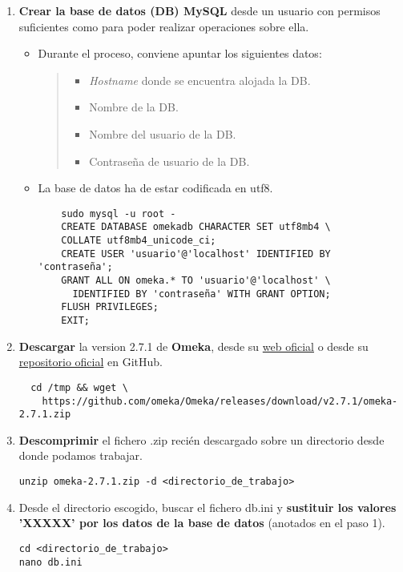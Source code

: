 \begin{enumerate}
\def\labelenumi{\arabic{enumi}.}
\tightlist
\item
  \textbf{Crear la base de datos (DB) MySQL} desde un usuario con
  permisos suficientes como para poder realizar operaciones sobre ella.

  \begin{itemize}
  \item
    Durante el proceso, conviene apuntar los siguientes datos:

    \begin{quote}
    \begin{itemize}
    \tightlist
    \item
      \emph{Hostname} donde se encuentra alojada la DB.
    \item
      Nombre de la DB.
    \item
      Nombre del usuario de la DB.
    \item
      Contraseña de usuario de la DB.
    \end{itemize}
    \end{quote}
  \item
    La base de datos ha de estar codificada en {utf8}.
    \begin{verbatim}
 	sudo mysql -u root -
   	CREATE DATABASE omekadb CHARACTER SET utf8mb4 \
   	COLLATE utf8mb4_unicode_ci;
   	CREATE USER 'usuario'@'localhost' IDENTIFIED BY 'contraseña';
   	GRANT ALL ON omeka.* TO 'usuario'@'localhost' \
      IDENTIFIED BY 'contraseña' WITH GRANT OPTION;
   	FLUSH PRIVILEGES;
   	EXIT;
   	\end{verbatim}
  \end{itemize}
  \item
  \textbf{Descargar} la version 2.7.1 de \textbf{Omeka}, desde su \href{https://omeka.org/classic/download/}{web oficial} o desde su \href{http://github.com/omeka/Omeka}{repositorio oficial} en
  GitHub.
  \begin{verbatim}
  cd /tmp && wget \
    https://github.com/omeka/Omeka/releases/download/v2.7.1/omeka-2.7.1.zip
  \end{verbatim}
\item
  \textbf{Descomprimir} el fichero {.zip} recién descargado sobre un
  directorio desde donde podamos trabajar.
\begin{verbatim}
unzip omeka-2.7.1.zip -d <directorio_de_trabajo>
\end{verbatim}
\item
  Desde el directorio escogido, buscar el fichero {db.ini} y
  \textbf{sustituir los valores 'XXXXX' por los datos de la base de
  datos} (anotados en el paso 1).
\begin{verbatim}
cd <directorio_de_trabajo>
nano db.ini


\end{verbatim}
\end{enumerate}

